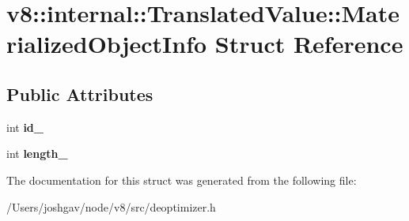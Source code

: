 \hypertarget{structv8_1_1internal_1_1_translated_value_1_1_materialized_object_info}{}\section{v8\+:\+:internal\+:\+:Translated\+Value\+:\+:Materialized\+Object\+Info Struct Reference}
\label{structv8_1_1internal_1_1_translated_value_1_1_materialized_object_info}
\subsection*{Public Attributes}
\begin{DoxyCompactItemize}
\item 
int {\bfseries id\+\_\+}\hypertarget{structv8_1_1internal_1_1_translated_value_1_1_materialized_object_info_a94816604c800a0ba5d8e0f73abc5564d}{}\label{structv8_1_1internal_1_1_translated_value_1_1_materialized_object_info_a94816604c800a0ba5d8e0f73abc5564d}

\item 
int {\bfseries length\+\_\+}\hypertarget{structv8_1_1internal_1_1_translated_value_1_1_materialized_object_info_aca92b0ff457fe01e34824a0d69fbba29}{}\label{structv8_1_1internal_1_1_translated_value_1_1_materialized_object_info_aca92b0ff457fe01e34824a0d69fbba29}

\end{DoxyCompactItemize}


The documentation for this struct was generated from the following file\+:\begin{DoxyCompactItemize}
\item 
/\+Users/joshgav/node/v8/src/deoptimizer.\+h\end{DoxyCompactItemize}

